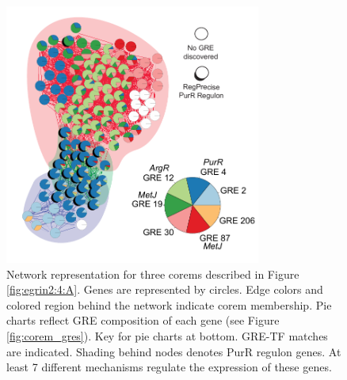 \begin{figure}[h!]
    \centering
    \includegraphics[width=0.75\textwidth]{figures/purR_network}
 	\caption[Corems integrate diverse regulatory mechanisms, \textit{E. coli}]{Network representation for three corems described in Figure \ref{fig:egrin2:4:A}. Genes are represented by circles. Edge colors and colored region behind the network indicate corem membership. Pie charts reflect GRE composition of each gene (see Figure \ref{fig:corem_gres}). Key for pie charts at bottom. GRE-TF matches are indicated. Shading behind nodes denotes PurR regulon genes. At least 7 different mechanisms regulate the expression of these genes.
}
    \label{fig:purR_network}
\end{figure}

